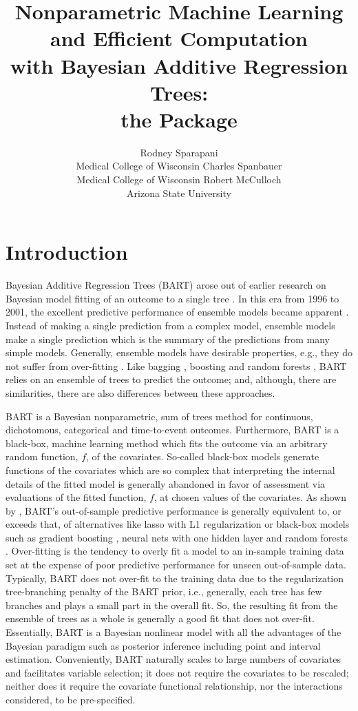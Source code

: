 \documentclass[article]{jss}
\author{Rodney Sparapani\\Medical College of Wisconsin
\And Charles Spanbauer\\Medical College of Wisconsin
\And Robert McCulloch\\Arizona State University}
\title{Nonparametric Machine Learning\\ and Efficient Computation\\
  with Bayesian Additive Regression Trees:\\ the \pkg{BART}
  \proglang{R} Package}
\begin{document}
\maketitle
\clearpage

\section{Introduction}

Bayesian Additive Regression Trees (BART) arose out of earlier
research on Bayesian model fitting of an outcome to a single tree
\citep{ChipGeor98}.  In this era from 1996 to 2001, the excellent
predictive performance of ensemble models became apparent
\citep{Brei96,KrogSoli97,FreuScha97,Brei01,Frie01,BaldBrun01}.
Instead of making a single prediction from a complex model, ensemble
models make a single prediction which is the summary of the
predictions from many simple models.  Generally, ensemble models have
desirable properties, e.g., they do not suffer from over-fitting
\citep{KuhnJohn13}.  Like bagging \citep{Brei96}, boosting
\citep{FreuScha97,Frie01} and random forests \citep{Brei01}, BART
relies on an ensemble of trees to predict the outcome; and, although,
there are similarities, there are also differences between these
approaches.

BART is a Bayesian nonparametric, sum of trees method for continuous,
dichotomous, categorical and time-to-event outcomes.  Furthermore,
BART is a black-box, machine learning method which fits the outcome
via an arbitrary random function, $f$, of the covariates.  So-called
black-box models generate functions of the covariates which are so
complex that interpreting the internal details of the fitted model is
generally abandoned in favor of assessment via evaluations of the
fitted function, $f$, at chosen values of the covariates.  As shown by
\citet{ChipGeor10}, BART's out-of-sample predictive performance is
generally equivalent to, or exceeds that, of alternatives like lasso
with L1 regularization \citep{EfroHast04} or black-box models such as
gradient boosting \citep{FreuScha97,Frie01}, neural nets with one
hidden layer \citep{Ripl07,VenaRipl13} and random forests
\citep{Brei01}.  Over-fitting is the tendency to overly fit a model to
an in-sample training data set at the expense of poor predictive
performance for unseen out-of-sample data.  Typically, BART does not
over-fit to the training data due to the regularization tree-branching
penalty of the BART prior, i.e., generally, each tree has few branches
and plays a small part in the overall fit.  So, the resulting fit from
the ensemble of trees as a whole is generally a good fit that does not
over-fit.  Essentially, BART is a Bayesian nonlinear model with all
the advantages of the Bayesian paradigm such as posterior inference
including point and interval estimation.  Conveniently, BART naturally
scales to large numbers of covariates and facilitates variable
selection; it does not require the covariates to be rescaled; neither
does it require the covariate functional relationship, nor the
interactions considered, to be pre-specified.
\end{document}
